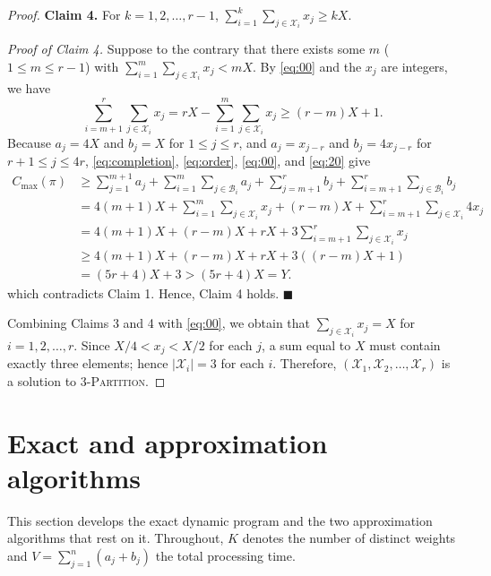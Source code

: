 ﻿\documentclass[12pt]{article}
\let\origsection\section
\renewcommand{\section}{\FloatBarrier\origsection}
\begin{document}
\begin{sloppypar}
\begin{proof}
            \textbf{Claim 4.} For $k=1, 2, \ldots, r-1$, $\sum_{i=1}^k \sum_{j \in \mathcal{X}_i} x_j \geq kX$. 
            
            \textit{Proof of Claim 4.} Suppose to the contrary that there exists some $m$ ($1 \leq m \leq r-1$) with $\sum_{i=1}^m \sum_{j \in \mathcal{X}_i} x_j < mX$. By \cref{eq:00} and the $x_j$ are integers, we have
            \begin{equation}\label{eq:20}
                \sum_{i=m+1}^r \sum_{j \in \mathcal{X}_i} x_j=rX-\sum_{i=1}^m \sum_{j \in \mathcal{X}_i} x_j \geq (r-m)X+1. 
            \end{equation}
            Because $a_j=4X$ and $b_j=X$ for $1 \leq j \leq r$, and $a_j=x_{j-r}$ and $b_j=4 x_{j-r}$ for $r+1 \leq j \leq 4r$, \cref{eq:completion}, \cref{eq:order}, \cref{eq:00}, and \cref{eq:20} give 
            \begin{align*}
                C_{\max}(\pi) & \geq \sum_{j=1}^{m+1} a_j+\sum_{i=1}^m \sum_{j \in \mathcal{B}_i} a_j+\sum_{j=m+1}^r      b_j+\sum_{i=m+1}^r \sum_{j \in \mathcal{B}_i} b_j  \nonumber \\ 
                &= 4(m+1)X+\sum_{i=1}^m \sum_{j \in \mathcal{X}_i} x_j +(r-m)X +\sum_{i=m+1}^r \sum_{j \in \mathcal{X}_i} 4 x_j \nonumber \\
                &= 4(m+1)X +(r-m)X + rX+ 3 \sum_{i=m+1}^r \sum_{j \in \mathcal{X}_i} x_j \\
                & \geq 4(m+1)X +(r-m)X + rX+ 3((r-m)X+1)  \nonumber \\
                & = (5r+4)X +3 > (5r+4)X = Y. \nonumber
            \end{align*} 
            which contradicts Claim 1. Hence, Claim 4 holds. \hfill$\blacksquare$
            
            Combining Claims 3 and 4 with \cref{eq:00}, we obtain that $\sum_{j \in \mathcal{X}_i} x_j=X$ for $i=1, 2, \ldots, r$. Since $X/4 < x_j < X/2$ for each $j$, a sum equal to $X$ must contain exactly three elements; hence  $|\mathcal{X}_i|=3$ for each $i$. Therefore, $(\mathcal{X}_1, \mathcal{X}_2, \ldots, \mathcal{X}_r)$ is a solution to 3-\textsc{Partition}.
        \end{proof}

\section{Exact and approximation algorithms}
\label{sec:dp_algorithm}
This section develops the exact dynamic program and the two approximation algorithms that
rest on it. Throughout, $K$ denotes the number of distinct weights and
$V=\sum_{j=1}^{n}(a_j+b_j)$ the total processing time.


\end{sloppypar}
\end{document}
